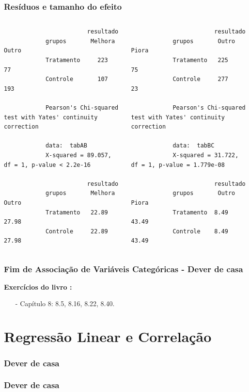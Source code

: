 \documentclass[graphics,14pt]{beamer}
\begin{document}
\begin{frame}[t,fragile=singleslide]
\frametitle{Resíduos e tamanho do efeito}
	\begin{columns}[T] %
		\begin{column}{.48\textwidth}
			\begin{lstlisting}
			            resultado
			grupos       Melhora Outro
			Tratamento     223    77
			Controle       107   193
			
			Pearson's Chi-squared test with Yates' continuity correction
			
			data:  tabAB
			X-squared = 89.057, df = 1, p-value < 2.2e-16
			
			            resultado
			grupos       Melhora Outro
			Tratamento   22.89 	27.98
			Controle     22.89 	27.98
			\end{lstlisting}
		\end{column}%
		\hfill%
		\begin{column}{.48\textwidth}	
			\begin{lstlisting}
			            resultado
			grupos       Outro Piora
			Tratamento   225    75
			Controle     277    23
			
			Pearson's Chi-squared test with Yates' continuity correction
			
			data:  tabBC
			X-squared = 31.722, df = 1, p-value = 1.779e-08
			
			            resultado
			grupos       Outro Piora
			Tratamento  8.49 	43.49
			Controle    8.49 	43.49
			\end{lstlisting}			
		\end{column}%
	\end{columns}

\end{frame}
\begin{frame}[t,fragile=singleslide]
\frametitle{Fim de Associação de Variáveis Categóricas - Dever de casa}
\textbf{Exercícios do livro \cite{Agresti2018}:}
\begin{itemize}
	\item[-] Capítulo 8: 8.5, 8.16, 8.22, 8.40.
\end{itemize}
\end{frame}
\section{Regressão Linear e Correlação}
\begin{frame}[t,fragile=singleslide]
\frametitle{Dever de casa}
\end{frame}
\begin{frame}[t,fragile=singleslide]
\frametitle{Dever de casa}
\end{frame}
\end{document}
